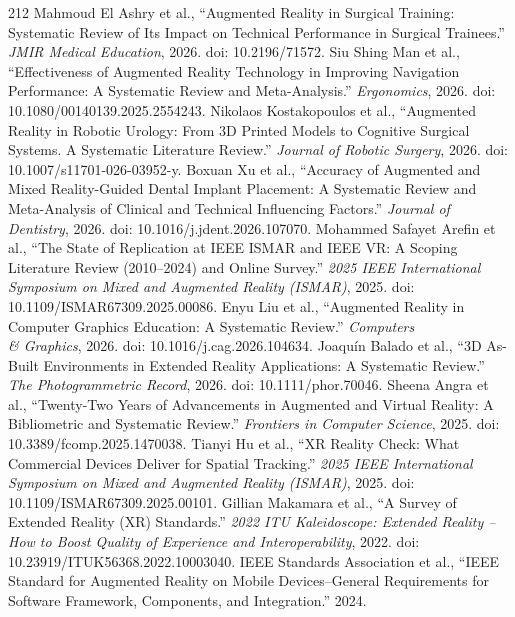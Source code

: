 \begin{thebibliography}{212}
 Mahmoud El Ashry et al., ``Augmented Reality in Surgical Training: Systematic Review of Its Impact on Technical Performance in Surgical Trainees.'' \emph{JMIR Medical Education}, 2026. doi: 10.2196/71572.
 Siu Shing Man et al., ``Effectiveness of Augmented Reality Technology in Improving Navigation Performance: A Systematic Review and Meta-Analysis.'' \emph{Ergonomics}, 2026. doi: 10.1080/00140139.2025.2554243.
 Nikolaos Kostakopoulos et al., ``Augmented Reality in Robotic Urology: From 3D Printed Models to Cognitive Surgical Systems. A Systematic Literature Review.'' \emph{Journal of Robotic Surgery}, 2026. doi: 10.1007/s11701-026-03952-y.
 Boxuan Xu et al., ``Accuracy of Augmented and Mixed Reality-Guided Dental Implant Placement: A Systematic Review and Meta-Analysis of Clinical and Technical Influencing Factors.'' \emph{Journal of Dentistry}, 2026. doi: 10.1016/j.jdent.2026.107070.
 Mohammed Safayet Arefin et al., ``The State of Replication at {IEEE ISMAR} and {IEEE VR}: A Scoping Literature Review (2010--2024) and Online Survey.'' \emph{2025 IEEE International Symposium on Mixed and Augmented Reality (ISMAR)}, 2025. doi: 10.1109/ISMAR67309.2025.00086.
 Enyu Liu et al., ``Augmented Reality in Computer Graphics Education: A Systematic Review.'' \emph{Computers \\& Graphics}, 2026. doi: 10.1016/j.cag.2026.104634.
 Joaqu{\'i}n Balado et al., ``3D As-Built Environments in Extended Reality Applications: A Systematic Review.'' \emph{The Photogrammetric Record}, 2026. doi: 10.1111/phor.70046.
 Sheena Angra et al., ``Twenty-Two Years of Advancements in Augmented and Virtual Reality: A Bibliometric and Systematic Review.'' \emph{Frontiers in Computer Science}, 2025. doi: 10.3389/fcomp.2025.1470038.
 Tianyi Hu et al., ``{XR} Reality Check: What Commercial Devices Deliver for Spatial Tracking.'' \emph{2025 IEEE International Symposium on Mixed and Augmented Reality (ISMAR)}, 2025. doi: 10.1109/ISMAR67309.2025.00101.
 Gillian Makamara et al., ``A Survey of Extended Reality ({XR}) Standards.'' \emph{2022 ITU Kaleidoscope: Extended Reality -- How to Boost Quality of Experience and Interoperability}, 2022. doi: 10.23919/ITUK56368.2022.10003040.
 {IEEE Standards Association} et al., ``{IEEE Standard for Augmented Reality on Mobile Devices--General Requirements for Software Framework, Components, and Integration}.'' 2024.

\end{thebibliography}
